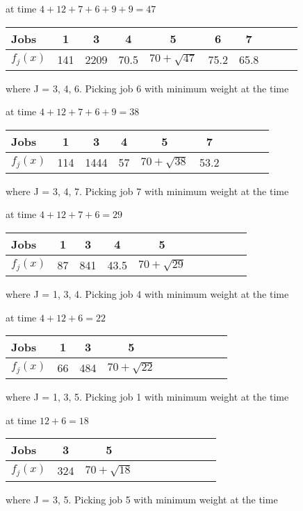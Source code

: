 \documentclass[12pt]{article}
\begin{document}
\begin{enumerate}
\begin{itemize}
at time $4 + 12 + 7 + 6 + 9 + 9 = 47$
\begin{center}
\begin{tabular}{l*{8}{c}r}
Jobs          & 1 & 3 & 4 & 5 & 6 & 7                                         \\
\hline
$f_{j}(x)$    & 141 & 2209 & 70.5 & $70 + \sqrt{47}$ & 75.2 & 65.8            \\
\end{tabular}
\end{center}
where J = 3, 4, 6. Picking job 6 with minimum weight at the time

at time $4 + 12 + 7 + 6 + 9 = 38$
\begin{center}
\begin{tabular}{l*{8}{c}r}
Jobs          & 1 & 3 & 4 & 5 & 7                                       \\
\hline
$f_{j}(x)$    & 114 & 1444 & 57 & $70 + \sqrt{38}$ & 53.2               \\
\end{tabular}
\end{center}
where J = 3, 4, 7. Picking job 7 with minimum weight at the time

at time $4 + 12 + 7 + 6 = 29$
\begin{center}
\begin{tabular}{l*{8}{c}r}
Jobs          & 1 & 3 & 4 & 5                                    \\
\hline
$f_{j}(x)$    & 87 & 841 & 43.5 & $70 + \sqrt{29}$               \\
\end{tabular}
\end{center}
where J = 1, 3, 4. Picking job 4 with minimum weight at the time

at time $4 + 12 + 6 = 22$
\begin{center}
\begin{tabular}{l*{8}{c}r}
Jobs          & 1 & 3 & 5                                 \\
\hline
$f_{j}(x)$    & 66 & 484 & $70 + \sqrt{22}$               \\
\end{tabular}
\end{center}
where J = 1, 3, 5. Picking job 1 with minimum weight at the time

at time $12 + 6 = 18$
\begin{center}
\begin{tabular}{l*{8}{c}r}
Jobs          & 3 & 5                                \\
\hline
$f_{j}(x)$    & 324 & $70 + \sqrt{18}$               \\
\end{tabular}
\end{center}
where J = 3, 5. Picking job 5 with minimum weight at the time


\end{itemize}
\end{enumerate}
\end{document}
